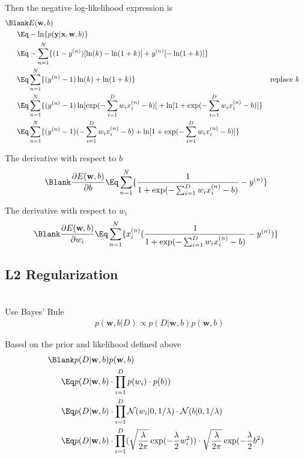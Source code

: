 \documentclass{article}
\begin{document}
Then the negative log-likelihood expression is
\begin{align*}
\Blank & E(\mathbf{w}, b)\\
\Eq & -\ln\{ p(\mathbf{y} | \mathbf{x}, \mathbf{w}, b) \}\\
\Eq & -\sum_{n=1}^{N} \{ (1-y^{(n)}) [\ln(k) - \ln(1 + k)] + y^{(n)} [-\ln(1 + k)] \}\\
\Eq & \sum_{n=1}^{N} \{ (y^{(n)}-1)\ln(k) + \ln(1 + k) \} && \text{replace } k\\
\Eq & \sum_{n=1}^{N} \{ (y^{(n)}-1)\ln[\exp(-\sum_{i=1}^{D} w_{i}x_{i}^{(n)} - b)] + \ln[1 + \exp(-\sum_{i=1}^{D} w_{i}x_{i}^{(n)} - b)] \}\\
\Eq & \sum_{n=1}^{N} \{ (y^{(n)}-1)(-\sum_{i=1}^{D} w_{i}x_{i}^{(n)} - b) + \ln[1 + \exp(-\sum_{i=1}^{D} w_{i}x_{i}^{(n)} - b)] \}
\end{align*}

The derivative with respect to $b$
\begin{align*}
\Blank  \frac{\partial E(\mathbf{w}, b)}{\partial b} \Eq  \sum_{n=1}^{N} \{\frac{1}{1 + \exp(- \sum_{i=1}^{D} w_{i}x_{i}^{(n)} - b)} - y^{(n)}\}
\end{align*}

The derivative with respect to $w_i$
\begin{align*}
\Blank  \frac{\partial E(\mathbf{w}, b)}{\partial w_i} \Eq  \sum_{n=1}^{N} \{ x_{i}^{(n)} (\frac{1}{1 + \exp(- \sum_{i=1}^{D} w_{i}x_{i}^{(n)} - b)} - y^{(n)}) \}\\
\end{align*}

\subsection{L2 Regularization}

\ \\

Use Bayes' Rule
\begin{align*}
& p(\mathbf{w}, b | D) \propto p(D | \mathbf{w}, b) p(\mathbf{w}, b)
\end{align*}

Based on the prior and likelihood defined above
\begin{align*}
\Blank & p(D | \mathbf{w}, b) p(\mathbf{w}, b)\\
\Eq & p(D | \mathbf{w}, b) \cdot \prod_{i=1}^{D} p(w_i) \cdot p(b))\\
\Eq & p(D | \mathbf{w}, b) \cdot \prod_{i=1}^{D} \mathcal{N}(w_i | 0, 1/\lambda) \cdot \mathcal{N}(b | 0, 1/\lambda)\\
\Eq & p(D | \mathbf{w}, b) \cdot \prod_{i=1}^{D} ( \sqrt{\frac{\lambda}{2\pi}} \exp(-\frac{\lambda}{2}w_i^2) ) \cdot  \sqrt{\frac{\lambda}{2\pi}} \exp(-\frac{\lambda}{2}b^2)\\
\end{align*}
\end{document}
